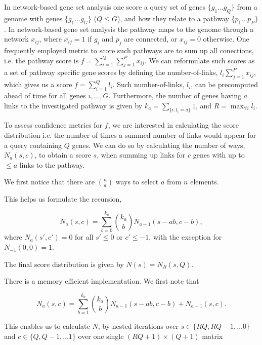 \documentclass[11pt]{article}
\begin{document}
In network-based gene set analysis one score a query set of genes $ \{g_1 \ldots g_Q\} $ from a genome with genes $\{g_1 \ldots g_G\}$ ($Q \le G$), and how they relate to a pathway $\{p_1 \ldots p_P\}$. In network-based gene set analysis the pathway maps to the genome through a network ${x_{ij}}$, where $x_{ij}=1$ if $g_i$ and $p_j$ are connected, or $x_{ij}=0$ otherwise. One frequently employed metric to score such pathways are to sum up all conections, i.e. the pathway score is $f=\sum_{i=1}^Q\sum_{j=1}^P x_{ij}$.
We can reformulate such scores as a set of pathway specific gene scores by defining the number-of-links, $l_i\sum_{j=1}^P x_{ij}$, which gives us a score $f=\sum_{i=1}^Q l_i$.
Such number-of-links, $l_i$, can be precomputed ahead of time for all genes $i, \ldots, G$.
Furthermore, the number of genes having $a$ links to the investigated pathway is given by $k_a=\sum_{\{i:l_i=a\}}1$, and $R=\max_{\forall i}{l_i}$.

To assess confidence metrics for $f$, we are interested in calculating the score distribution i.e. the number of times a summed number of links would appear for a query containing $Q$ genes.
We can do so by calculating the number of ways, $N_a(s,c)$, to obtain a score $s$, when summing up links for $c$ genes with up to $\le a$ links to the pathway.

We first notice that there are $n\choose a$ ways to select $a$ from $n$ elements.

This helps us formulate the recursion,

\[
N_a(s,c)=\sum_{b=0}^{k_a}{k_a \choose b} N_{a-1}(s-ab,c-b),
\]
where $N_a(s',c')=0$ for all $s'\le 0$ or $c' \le -1$, with the exception for $N_{-1}(0,0)=1$.

The final score distribution is given by $N(s)=N_R(s,Q)$.

There is a memory efficient implementation. We first note that

\[
N_a(s,c)=\sum_{b=1}^{k_a}{k_a \choose b} N_{a-1}(s-ab,c-b) + N_{a-1}(s,c).
\]


This enables us to calculate $N$, by nested iterations over $s \in \{ RQ, RQ-1, \ldots 0 \}$ and $c \in \{ Q, Q-1, \ldots 1 \}$ over one single $(RQ+1) \times (Q+1)$ matrix
\end{document}

